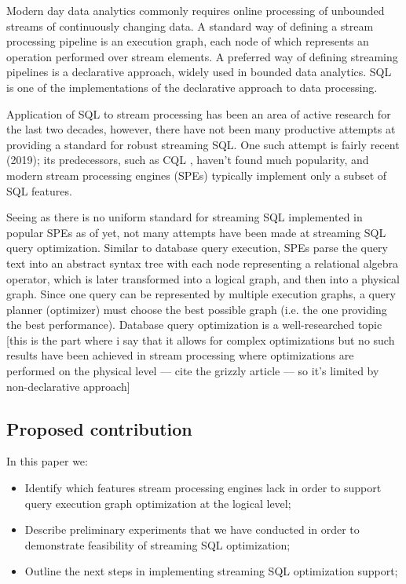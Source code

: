 \label {fs-optimization-introduction}

Modern day data analytics commonly requires online processing of unbounded streams of continuously changing data. A standard way of defining a stream processing pipeline is an execution graph, each node of which represents an operation performed over stream elements. A preferred way of defining streaming pipelines is a declarative approach, widely used in bounded data analytics. SQL is one of the implementations of the declarative approach to data processing. 

Application of SQL to stream processing has been an area of active research for the last two decades, however, there have not been many productive attempts at providing a standard for robust streaming SQL. One such attempt \cite{Begoli:2019:OSR:3299869.3314040} is fairly recent (2019); its predecessors, such as CQL \cite{Arasu:2006:CCQ:1146461.1146463}, haven't found much popularity, and modern stream processing engines (SPEs) typically implement only a subset of SQL features.

Seeing as there is no uniform standard for streaming SQL implemented in popular SPEs as of yet, not many attempts have been made at streaming SQL query optimization. Similar to database query execution, SPEs parse the query text into an abstract syntax tree with each node representing a relational algebra operator, which is later transformed into a logical graph, and then into a physical graph. Since one query can be represented by multiple execution graphs, a query planner (optimizer) must choose the best possible graph (i.e. the one providing the best performance). Database query optimization is a well-researched topic [this is the part where i say that it allows for complex optimizations but no such results have been achieved in stream processing where optimizations are performed on the physical level --- cite the grizzly article --- so it's limited by non-declarative approach]




\subsection{Proposed contribution}

In this paper we:
\begin{itemize}
    \item Identify which features stream processing engines lack in order to support query execution graph optimization at the logical level;
    \item Describe preliminary experiments that we have conducted in order to demonstrate feasibility of streaming SQL optimization;
    \item Outline the next steps in implementing streaming SQL optimization support; %
\end{itemize}

